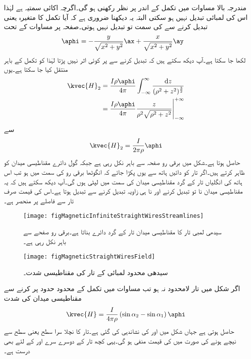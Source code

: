 مندرجہ بالا مساوات میں تکمل کے اندر  پر نظر رکھنی ہو گی۔اگرچہ  اکائی سمتیہ ہے لہٰذا اس کی لمبائی تبدیل نہیں ہو سکتی البتہ یہ دیکھنا ضروری ہے کہ آیا تکمل کا متغیرہ یعنی  تبدیل کرنے سے  کی سمت تو تبدیل نہیں ہوتی۔صفحہ  پر مساوات  کے تحت
\begin{align*}
\aphi&=-\frac{y}{\sqrt{x^2+y^2}} \ax+\frac{x}{\sqrt{x^2+y^2}} \ay
\end{align*}
لکھا جا سکتا ہے۔آپ دیکھ سکتے ہیں کہ  تبدیل کرنے سے  پر کوئی اثر نہیں پڑتا لہٰذا  کو تکمل کے باہر منتقل کیا جا سکتا ہے۔یوں
\begin{gather}
\begin{aligned}\label{مساوات_مقناطیسی_سیدھی_لامحدود_تار_کا_میدان}
\kvec{H}_2&=\frac{I \rho\aphi}{4\pi}\int_{-\infty}^{\infty} \frac{\dif z }{(\rho^2+z^2)^{\frac{3}{2}}}\\
&=\eval{\frac{I \rho \aphi}{4\pi} \frac{z}{\rho^2 \sqrt{\rho^2+z^2}}}_{-\infty}^{+\infty}
\end{aligned}
\end{gather}    
سے
\begin{align}
\kvec{H}_2=\frac{I}{2\pi \rho} \aphi
\end{align}
حاصل ہوتا ہے۔شکل  میں برقی رو صفحہ سے باہر نکل رہی ہے جبکہ گول دائرے مقناطیسی میدان کو ظاہر کرتے ہیں۔اگر تار کو دائیں ہاتھ سے یوں پکڑا جائے کہ انگوٹھا برقی رو کی سمت میں ہو تب اس ہاتھ کی انگلیاں تار کے گرد مقناطیسی میدان کی سمت میں لپٹی ہوں گی۔آپ دیکھ سکتے ہیں کہ یہ مقناطیسی میدان نا تو  تبدیل کرنے اور نا ہی زاویہ  تبدیل کرنے سے تبدیل ہوتا ہے۔اس کی قیمت صرف تار سے فاصلے پر منحصر ہے۔
\begin{figure}
\centering
\texttt{[image: figMagneticInfiniteStraightWiresStreamlines]}
\caption{سیدھی لمبی تار کا مقناطیسی میدان تار کے گرد دائرے بناتا ہے۔برقی رو صفحے سے باہر نکل رہی ہے۔}
\label{شکل_مقناطیسی_سیدھے_تار_کا_میدان_دائرے}
\end{figure}
%
\begin{figure}
\centering
\texttt{[image: figMagneticStraightWiresField]}
\caption{سیدھی  محدود لمبائی کے تار کی مقناطیسی شدت۔}
\label{شکل_مقناطیسی_سیدھے_محدود_تار_کا_میدان}
\end{figure}

اگر شکل  میں تار لامحدود نہ ہو تب مساوات  میں تکمل کے محدود حدود پر کرنے سے مقناطیسی میدان کی شدت
\begin{align}\label{مساوات_مقناطیسی_محدود_تار_کی_مقناطیس}
\kvec{H}=\frac{I}{4\pi \rho} \left(\sin \alpha_2-\sin \alpha_1 \right) \aphi
\end{align}
حاصل ہوتی ہے جہاں شکل  میں  اور  کی نشاندہی کی گئی ہے۔تار کا نچلا سرا  سطح یعنی  سطح سے نیچے ہونے کی صورت میں  کی قیمت منفی ہو گی۔یہی کچھ تار کے دوسرے سرے اور  کے لئے بھی درست ہے۔


